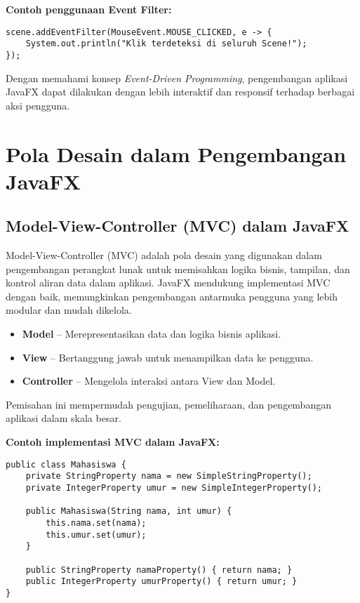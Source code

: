 \textbf{Contoh penggunaan Event Filter:}
\begin{lstlisting}[style=JavaStyle, caption=Menambahkan Event Filter pada Scene]
scene.addEventFilter(MouseEvent.MOUSE_CLICKED, e -> {
	System.out.println("Klik terdeteksi di seluruh Scene!");
});
\end{lstlisting}

Dengan memahami konsep \textit{Event-Driven Programming}, pengembangan aplikasi JavaFX dapat dilakukan dengan lebih interaktif dan responsif terhadap berbagai aksi pengguna.

\section{Pola Desain dalam Pengembangan JavaFX}

\subsection{Model-View-Controller (MVC) dalam JavaFX}

Model-View-Controller (MVC) adalah pola desain yang digunakan dalam pengembangan perangkat lunak untuk memisahkan logika bisnis, tampilan, dan kontrol aliran data dalam aplikasi. JavaFX mendukung implementasi MVC dengan baik, memungkinkan pengembangan antarmuka pengguna yang lebih modular dan mudah dikelola.

\begin{itemize}
\item \textbf{Model} – Merepresentasikan data dan logika bisnis aplikasi.
\item \textbf{View} – Bertanggung jawab untuk menampilkan data ke pengguna.
\item \textbf{Controller} – Mengelola interaksi antara View dan Model.
\end{itemize}

Pemisahan ini mempermudah pengujian, pemeliharaan, dan pengembangan aplikasi dalam skala besar.

\textbf{Contoh implementasi MVC dalam JavaFX:}

\begin{lstlisting}[style=JavaStyle, caption=Model dalam aplikasi JavaFX]
public class Mahasiswa {
	private StringProperty nama = new SimpleStringProperty();
	private IntegerProperty umur = new SimpleIntegerProperty();
	
	public Mahasiswa(String nama, int umur) {
		this.nama.set(nama);
		this.umur.set(umur);
	}
	
	public StringProperty namaProperty() { return nama; }
	public IntegerProperty umurProperty() { return umur; }
}
\end{lstlisting}

